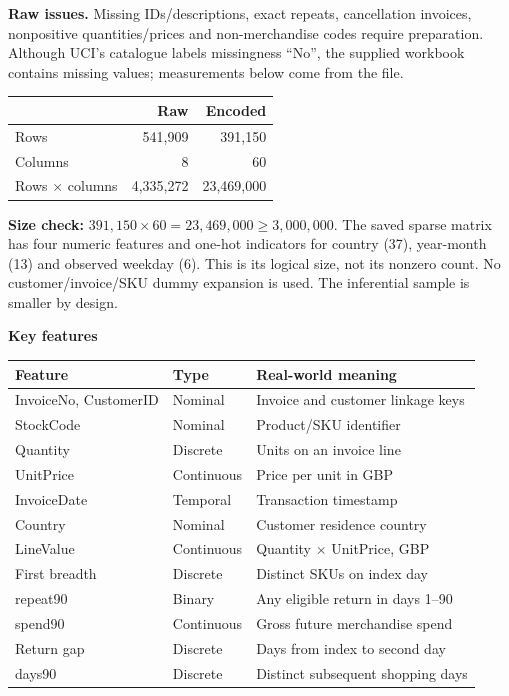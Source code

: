 \documentclass[10pt,a4paper,twocolumn]{article}
\newcommand{\minihead}[1]{\par\needspace{8\baselineskip}\smallskip\textbf{#1}\par}
\begin{document}
\textbf{Raw issues.} Missing IDs/descriptions, exact repeats, cancellation invoices, nonpositive quantities/prices and non-merchandise codes require preparation. Although UCI's catalogue labels missingness ``No'', the supplied workbook contains missing values; measurements below come from the file.

\par
{\small\begin{tabularx}{\linewidth}{@{}Yrr@{}}\toprule
&Raw&Encoded\\\midrule
Rows&541,909&391,150\\
Columns&8&60\\
Rows $\times$ columns&4,335,272&23,469,000\\\bottomrule
\end{tabularx}}\par
\textbf{Size check:} $391{,}150\times60=23{,}469{,}000\ge3{,}000{,}000$. The saved sparse matrix has four numeric features and one-hot indicators for country (37), year-month (13) and observed weekday (6). This is its logical size, not its nonzero count. No customer/invoice/SKU dummy expansion is used. The inferential sample is smaller by design.

\minihead{Key features}
\par
{\footnotesize\begin{tabularx}{\linewidth}{@{}L{2.15cm}L{1.45cm}Y@{}}\toprule
Feature&Type&Real-world meaning\\\midrule
InvoiceNo, CustomerID&Nominal&Invoice and customer linkage keys\\
StockCode&Nominal&Product/SKU identifier\\
Quantity&Discrete&Units on an invoice line\\
UnitPrice&Continuous&Price per unit in GBP\\
InvoiceDate&Temporal&Transaction timestamp\\
Country&Nominal&Customer residence country\\
LineValue&Continuous&Quantity $\times$ UnitPrice, GBP\\
First breadth&Discrete&Distinct SKUs on index day\\
repeat90&Binary&Any eligible return in days 1--90\\
spend90&Continuous&Gross future merchandise spend\\
Return gap&Discrete&Days from index to second day\\
days90&Discrete&Distinct subsequent shopping days\\\bottomrule
\end{tabularx}}\par
\end{document}
